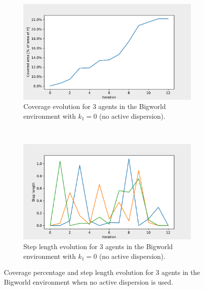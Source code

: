 \begin{figure}[H]
  \centering
  \begin{subfigure}[t]{0.5\textwidth}
    \centering
    \includegraphics[width=\textwidth]{figs/bigworld_3_agnt_k_1_0_k_2_1_area_traj.pdf}
    \caption{Coverage evolution for 3 agents in the Bigworld environment with $k_{1} = 0$ (no active dispersion).}
    \label{fig:3_agnt_bw_k_1_0_a_traj}
  \end{subfigure}%
  ~ 
  \begin{subfigure}[t]{0.5\textwidth}
    \centering
    \includegraphics[width=\textwidth]{figs/bigworld_3_agnt_k_1_0_k_2_1_step_traj.pdf}
    \caption{Step length evolution for 3 agents in the Bigworld environment with $k_{1} = 0$ (no active dispersion).}
    \label{fig:3_agnt_bw_k_1_0_s_traj}
  \end{subfigure}
  \caption{Coverage percentage and step length evolution for 3 agents in the Bigworld environment when no active dispersion is used.}
  \label{fig:3_agnt_bw_evolution}
\end{figure}


